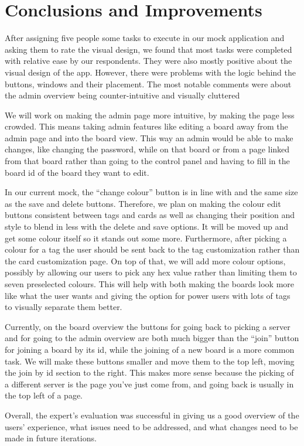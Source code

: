\section{Conclusions and Improvements}

After assigning five people some tasks to execute in our mock application and asking them to rate the visual design, we found that most tasks were completed with relative ease by our respondents. They were also mostly positive about the visual design of the app. However, there were problems with the logic behind the buttons, windows and their placement. The most notable comments were about the admin overview being counter-intuitive and visually cluttered

We will work on making the admin page more intuitive, by making the page less crowded. This means taking admin features like editing a board away from the admin page and into the board view. This way an admin would be able to make changes, like changing the password, while on that board or from a page linked from that board rather than going to the control panel and having to fill in the board id of the board they want to edit. 

In our current mock, the “change colour” button is in line with and the same size as the save and delete buttons. Therefore, we plan on making the colour edit buttons consistent between tags and cards as well as changing their position and style to blend in less with the delete and save options. It will be moved up and get some colour itself so it stands out some more. Furthermore, after picking a colour for a tag the user should be sent back to the tag customization rather than the card customization page. On top of that, we will add more colour options, possibly by allowing our users to pick any hex value rather than limiting them to seven preselected colours. This will help with both making the boards look more like what the user wants and giving the option for power users with lots of tags to visually separate them better.

Currently, on the board overview the buttons for going back to picking a server and for going to the admin overview are both much bigger than the “join” button for joining a board by its id, while the joining of a new board is a more common task. We will make these buttons smaller and move them to the top left, moving the join by id section to the right. This makes more sense because the picking of a different server is the page you’ve just come from, and going back is usually in the top left of a page.

Overall, the expert's evaluation was successful in giving us a good overview of the users’ experience, what issues need to be addressed, and what changes need to be made in future iterations.
